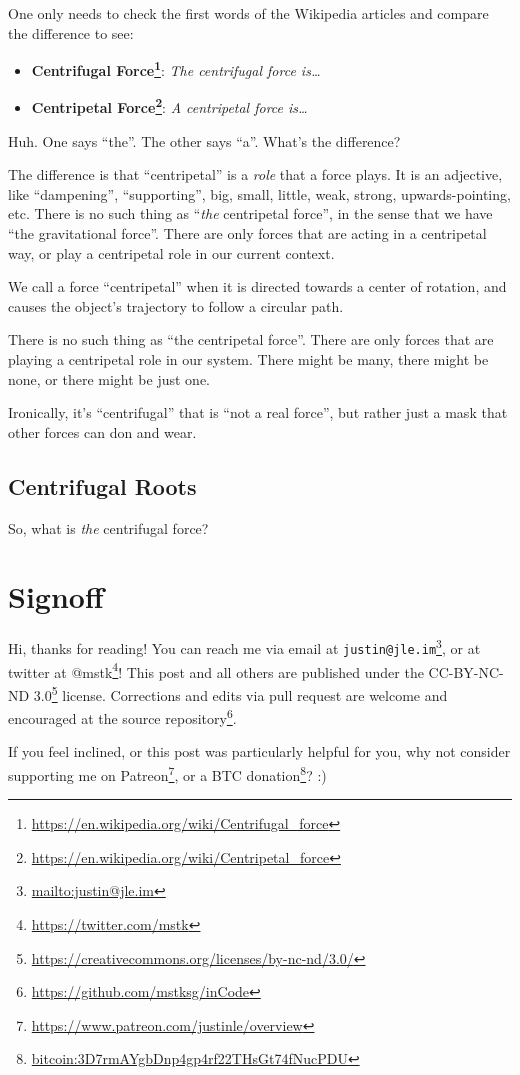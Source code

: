 \documentclass[]{article}
\renewcommand{\href}[2]{#2\footnote{\url{#1}}}
\begin{document}
One only needs to check the first words of the Wikipedia articles and compare
the difference to see:

\begin{itemize}
\tightlist
\item
  \textbf{\href{https://en.wikipedia.org/wiki/Centrifugal_force}{Centrifugal
  Force}}: \emph{The centrifugal force is\ldots{}}
\item
  \textbf{\href{https://en.wikipedia.org/wiki/Centripetal_force}{Centripetal
  Force}}: \emph{A centripetal force is\ldots{}}
\end{itemize}

Huh. One says ``the''. The other says ``a''. What's the difference?

The difference is that ``centripetal'' is a \emph{role} that a force plays. It
is an adjective, like ``dampening'', ``supporting'', big, small, little, weak,
strong, upwards-pointing, etc. There is no such thing as ``\emph{the}
centripetal force'', in the sense that we have ``the gravitational force''.
There are only forces that are acting in a centripetal way, or play a
centripetal role in our current context.

We call a force ``centripetal'' when it is directed towards a center of
rotation, and causes the object's trajectory to follow a circular path.

There is no such thing as ``the centripetal force''. There are only forces that
are playing a centripetal role in our system. There might be many, there might
be none, or there might be just one.

Ironically, it's ``centrifugal'' that is ``not a real force'', but rather just a
mask that other forces can don and wear.

\subsection{Centrifugal Roots}\label{centrifugal-roots}

So, what is \emph{the} centrifugal force?

\section{Signoff}\label{signoff}

Hi, thanks for reading! You can reach me via email at
\href{mailto:justin@jle.im}{\nolinkurl{justin@jle.im}}, or at twitter at
\href{https://twitter.com/mstk}{@mstk}! This post and all others are published
under the \href{https://creativecommons.org/licenses/by-nc-nd/3.0/}{CC-BY-NC-ND
3.0} license. Corrections and edits via pull request are welcome and encouraged
at \href{https://github.com/mstksg/inCode}{the source repository}.

If you feel inclined, or this post was particularly helpful for you, why not
consider \href{https://www.patreon.com/justinle/overview}{supporting me on
Patreon}, or a \href{bitcoin:3D7rmAYgbDnp4gp4rf22THsGt74fNucPDU}{BTC donation}?
:)
\end{document}
